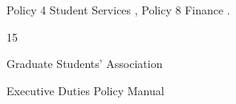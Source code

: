 Policy 4 Student Services , Policy 8 Finance .  

  

  

  

  

  

  

  

  

  

  

  

  

  

  

  



                                                               15  

                                            

                                          Graduate Students’ Association  

                                         Executive Duties Policy Manual  

  

